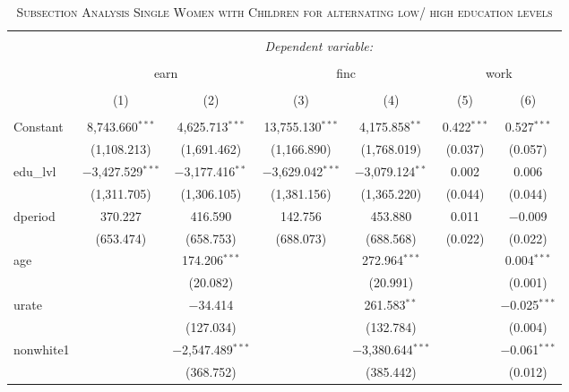 \documentclass[a4paper]{article}
\begin{document}
\begin{table}[!htbp] \centering 
\begin{adjustwidth}{0.cm}{-0cm}
\begin{threeparttable}
\small
\captionsetup{font=small, justification=raggedright,singlelinecheck=false}
\caption{\textsc{Subsection Analysis Single Women with Children for alternating low/ high education levels}}
\centering 
  \label{}
\small 
\begin{tabular}{@{\extracolsep{-1pt}}lcccccc} 
\\[-5.8ex]\hline 
\hline \\[-1.8ex] 
 & \multicolumn{6}{c}{\textit{Dependent variable:}} \\ 
\cline{2-7} 
\\[-1.8ex] & \multicolumn{2}{c}{earn} & \multicolumn{2}{c}{finc} & \multicolumn{2}{c}{work} \\ 
\\[-1.8ex] & (1) & (2) & (3) & (4) & (5) & (6)\\ 
\hline \\[-1.8ex] 
 Constant & 8,743.660$^{***}$ & 4,625.713$^{***}$ & 13,755.130$^{***}$ & 4,175.858$^{**}$ & 0.422$^{***}$ & 0.527$^{***}$ \\ 
  & (1,108.213) & (1,691.462) & (1,166.890) & (1,768.019) & (0.037) & (0.057) \\ 
  edu\_lvl & $-$3,427.529$^{***}$ & $-$3,177.416$^{**}$ & $-$3,629.042$^{***}$ & $-$3,079.124$^{**}$ & 0.002 & 0.006 \\ 
  & (1,311.705) & (1,306.105) & (1,381.156) & (1,365.220) & (0.044) & (0.044) \\ 
  dperiod & 370.227 & 416.590 & 142.756 & 453.880 & 0.011 & $-$0.009 \\ 
  & (653.474) & (658.753) & (688.073) & (688.568) & (0.022) & (0.022) \\ 
  age &  & 174.206$^{***}$ &  & 272.964$^{***}$ &  & 0.004$^{***}$ \\ 
  &  & (20.082) &  & (20.991) &  & (0.001) \\ 
  urate &  & $-$34.414 &  & 261.583$^{**}$ &  & $-$0.025$^{***}$ \\ 
  &  & (127.034) &  & (132.784) &  & (0.004) \\ 
  nonwhite1 &  & $-$2,547.489$^{***}$ &  & $-$3,380.644$^{***}$ &  & $-$0.061$^{***}$ \\ 
  &  & (368.752) &  & (385.442) &  & (0.012) \\ 

\end{tabular}
\end{threeparttable}
\end{adjustwidth}
\end{table}
\end{document}
